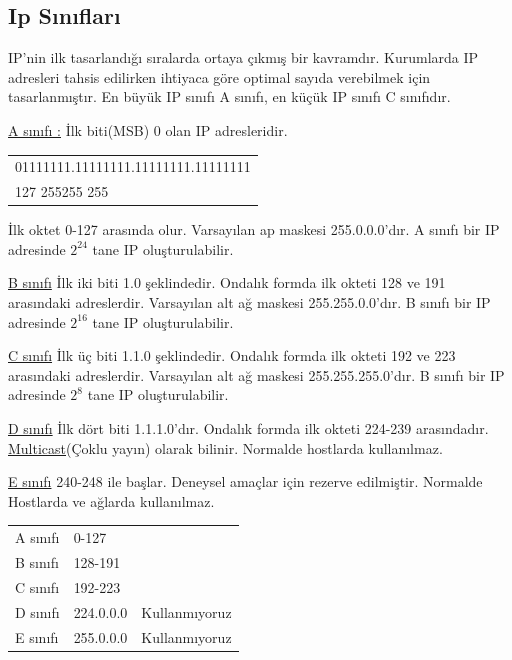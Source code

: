 \subsection{Ip Sınıfları}
IP'nin ilk tasarlandığı sıralarda ortaya çıkmış bir kavramdır. Kurumlarda IP adresleri tahsis edilirken ihtiyaca göre optimal sayıda verebilmek için tasarlanmıştır. En büyük IP sınıfı A sınıfı, en küçük IP sınıfı C sınıfıdır. 

\underline{A sınıfı :} İlk biti(MSB) 0 olan IP adresleridir. 

\begin{tabular}{l}
01111111.11111111.11111111.11111111 \\
  127  \hspace{1.1cm} 255\hspace{1.1cm}255\hspace{1.1cm} 255 \\
\end{tabular}

İlk oktet 0-127 arasında olur. Varsayılan ap maskesi 255.0.0.0'dır. A sınıfı bir IP adresinde $2^{24}$ tane IP oluşturulabilir.

\underline{B sınıfı} İlk iki biti 1.0 şeklindedir. Ondalık formda ilk  okteti 128 ve 191 arasındaki adreslerdir. Varsayılan alt ağ maskesi 255.255.0.0'dır. B sınıfı bir IP adresinde $2^{16}$ tane IP oluşturulabilir.


\underline{C sınıfı} İlk üç biti 1.1.0 şeklindedir. Ondalık formda ilk okteti 192 ve 223 arasındaki adreslerdir. Varsayılan alt ağ maskesi 255.255.255.0'dır. B sınıfı bir IP adresinde $2^{8}$ tane IP oluşturulabilir.

\underline{D sınıfı} İlk dört biti 1.1.1.0'dır. Ondalık formda ilk okteti 224-239 arasındadır. \underline{Multicast}(Çoklu yayın) olarak bilinir. Normalde hostlarda kullanılmaz. 

\underline{E sınıfı} 240-248 ile başlar. Deneysel amaçlar için rezerve edilmiştir. Normalde Hostlarda ve ağlarda kullanılmaz.

\begin{tabular}{lll}
A sınıfı & 0-127 & \\
B sınıfı & 128-191 & \\
C sınıfı & 192-223 & \\
D sınıfı & 224.0.0.0 \vline & Kullanmıyoruz \\
E sınıfı & 255.0.0.0 \vline  &Kullanmıyoruz \\
\end{tabular} 

